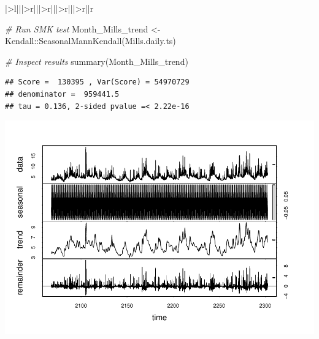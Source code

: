 \documentclass[
  12pt,
]{article}
\newenvironment{Shaded}{\begin{snugshade}}{\end{snugshade}}
\newcommand{\AttributeTok}[1]{\textcolor[rgb]{0.77,0.63,0.00}{#1}}
\newcommand{\CommentTok}[1]{\textcolor[rgb]{0.56,0.35,0.01}{\textit{#1}}}
\newcommand{\DecValTok}[1]{\textcolor[rgb]{0.00,0.00,0.81}{#1}}
\newcommand{\DocumentationTok}[1]{\textcolor[rgb]{0.56,0.35,0.01}{\textbf{\textit{#1}}}}
\newcommand{\FunctionTok}[1]{\textcolor[rgb]{0.00,0.00,0.00}{#1}}
\newcommand{\NormalTok}[1]{#1}
\newcommand{\OtherTok}[1]{\textcolor[rgb]{0.56,0.35,0.01}{#1}}
\newcommand{\SpecialCharTok}[1]{\textcolor[rgb]{0.00,0.00,0.00}{#1}}
\newcommand{\StringTok}[1]{\textcolor[rgb]{0.31,0.60,0.02}{#1}}
\begin{document}
\begin{table}
\begin{tabular}[t]{|>{}l|||>{}r|||>{}r|||>{}r|||>{}r||r}
\begin{Shaded}
\begin{Highlighting}[]
\CommentTok{\# Run SMK test}
\NormalTok{Month\_Mills\_trend }\OtherTok{\textless{}{-}}\NormalTok{ Kendall}\SpecialCharTok{::}\FunctionTok{SeasonalMannKendall}\NormalTok{(Mills.daily.ts)}

\CommentTok{\# Inspect results}
\FunctionTok{summary}\NormalTok{(Month\_Mills\_trend)}
\end{Highlighting}
\end{Shaded}

\begin{verbatim}
## Score =  130395 , Var(Score) = 54970729
## denominator =  959441.5
## tau = 0.136, 2-sided pvalue =< 2.22e-16
\end{verbatim}

\begin{Shaded}
\end{Shaded}

\includegraphics{Project_Template_files/figure-latex/TimeSeries-3.pdf}


\end{tabular}
\end{table}
\end{document}
